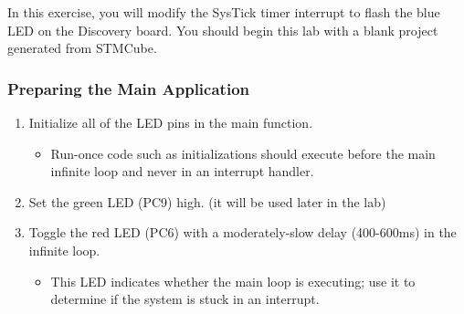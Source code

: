 \documentclass[11pt,fleqn]{book} %
\begin{document}
\begin{exercise}
    \label{ex1}
    In this exercise, you will modify the SysTick timer interrupt to flash the blue LED on the Discovery board. You should begin this lab with a blank project generated from STMCube.
    
   \subsubsection{Preparing the Main Application}
   \begin{enumerate}
       \item Initialize all of the LED pins in the main function.
       \begin{itemize}
           \item Run-once code such as initializations should execute before the main infinite loop and never in an interrupt handler.
       \end{itemize}
       \item Set the green LED (PC9) high. (it will be used later in the lab)
       \item Toggle the red LED (PC6) with a moderately-slow delay (400-600ms) in the infinite loop.
       \begin{itemize}
           \item This LED indicates whether the main loop is executing; use it to determine if the system is stuck in an interrupt.
       \end{itemize} 
   \end{enumerate}

\end{exercise}
\end{document}
